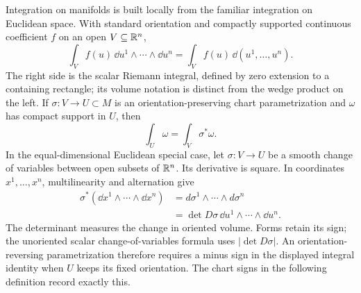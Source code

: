 Integration on manifolds is built locally from the familiar integration
on Euclidean space. With standard orientation and compactly supported
continuous coefficient $f$ on an open $V\subseteq\mathbb{R}^n$,
\[
\int_V f(u)\,\dd u^1\wedge\cdots\wedge\dd u^n
=\int_V f(u)\,\dd(u^1,\ldots,u^n).
\]
The right side is the scalar Riemann integral, defined by zero extension to
a containing rectangle; its volume notation is distinct from the wedge
product on the left. If $\sigma:V\to U\subset M$ is an orientation-preserving
chart parametrization and $\omega$ has compact support in $U$, then
\[
\int_U\omega=\int_V\sigma^*\omega.
\]
In the equal-dimensional Euclidean special case, let $\sigma:V\to U$
be a smooth change of variables between open subsets of $\mathbb{R}^n$.
Its derivative is square. In coordinates $x^1,\ldots,x^n$,
multilinearity and alternation give
\[
\begin{aligned}
\sigma^*(\dd x^1\wedge\cdots\wedge\dd x^n)
&=d\sigma^1\wedge\cdots\wedge d\sigma^n\\
&=\det D\sigma\,\dd u^1\wedge\cdots\wedge\dd u^n.
\end{aligned}
\]
The determinant measures the change in oriented volume. Forms retain its
sign; the unoriented scalar change-of-variables formula uses
$|\det D\sigma|$. An orientation-reversing parametrization therefore requires
a minus sign in the displayed integral identity when $U$ keeps its fixed
orientation. The chart signs in the following definition record exactly this.

